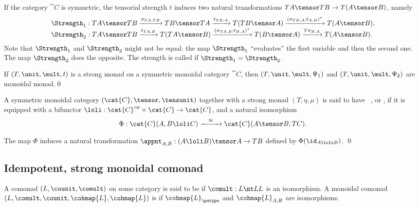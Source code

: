 \documentclass{llncs}
\begin{document}
\begin{remark}
  If the category $\cat{C}$ is symmetric, the tensorial strength
  $t$ induces two natural transformations
  $TA\tensor TB\to T(A\tensor B)$, namely
  \[\begin{array}{ll}
    \Strength_1:TA\tensor TB\xrightarrow{\sigma_{TA,TB}}
    TB\tensor TA\xrightarrow{t_{TB,A}}
    T(TB\tensor A)
    \xrightarrow{(\sigma_{TB,A};t_{A,B})^*}
    T(A\tensor B),
    \\
    \Strength_2:TA\tensor TB\xrightarrow{t_{TA,B}}
    T(TA\tensor B)
    \xrightarrow{(\sigma_{TA,B};t_{B,A})^*}
    T(B\tensor A) \xrightarrow{T\sigma_{B,A}}
    T(A\tensor B).
  \end{array}\]
  Note that $\Strength_1$ and $\Strength_2$ might not
  be equal: the map $\Strength_1$
  ``evaluates'' the first variable and then the second one. The map
  $\Strength_2$ does the opposite.  The strength is called
   if $\Strength_1=\Strength_2$.
\end{remark}

\begin{lemma}\label{lem:strongmonadmonoidal}
  If $(T,\unit,\mult,t)$ is a strong monad on a symmetric monoidal
  category $\cat{C}$, then $(T,\unit,\mult,\Psi_1)$ and 
  $(T,\unit,\mult,\Psi_2)$ are monoidal monad.\qed
\end{lemma}


\begin{definition}\label{def:texponential}\rm
  A symmetric monoidal category $(\cat{C},\tensor,\tensunit)$ together
  with a strong monad $(T,\eta,\mu)$ is said to have
  ~\cite{moggi91notions},
  or ,
  if it is equipped
  with a bifunctor $\loli:\cat{C}^{\it op}\times\cat{C}\to\cat{C}$,
  and a natural isomorphism
  \[
  \Phi:\cat{C}(A, B\loli C) \xrightarrow{\quad\cong\quad}
  \cat{C}(A\tensor B, TC).
  \]
\end{definition}

\begin{lemma}
  The map $\Phi$ induces a natural transformation
  $\appnt_{A,B} : (A\loli B)\tensor A\to TB$
  defined by $\Phi(\id_{A\loli B})$. \qed
\end{lemma}


\subsection{Idempotent, strong monoidal comonad}

A comonad $(L,\counit,\comult)$ on some category is said to be
 if $\comult:L\nt LL$ is an isomorphism.
A monoidal comonad $(L,\comult,\counit,\cohmap{L},\cohmap{L})$ is
 if $\cohmap{L}_{\putype}$ and $\cohmap{L}_{A,B}$ are
isomorphisms.
\end{document}
